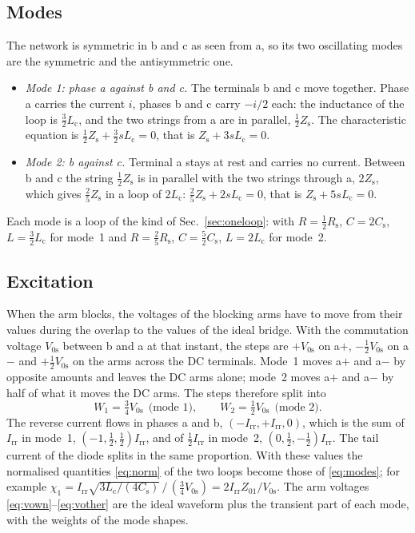 \documentclass[10pt,a4paper]{scrartcl}
\newcommand{\Irr}{I_\mathrm{rr}}
\newcommand{\Cs}{C_\mathrm{s}}
\newcommand{\Rs}{R_\mathrm{s}}
\newcommand{\Zs}{Z_\mathrm{s}}
\newcommand{\Lc}{L_\mathrm{c}}
\newcommand{\Vos}{V_\mathrm{0s}}
\begin{document}
\subsection{Modes}
The network is symmetric in b and c as seen from a, so its two oscillating modes are the symmetric and the antisymmetric one.
\begin{itemize}
\item \emph{Mode 1: phase a against b and c.} The terminals b and c move together. Phase a carries the current $i$, phases b and c carry $-i/2$ each: the inductance of the loop is $\tfrac32\Lc$, and the two strings from a are in parallel, $\tfrac12\Zs$. The characteristic equation is $\tfrac12\Zs + \tfrac32 s\Lc = 0$, that is $\Zs + 3s\Lc = 0$.
\item \emph{Mode 2: b against c.} Terminal a stays at rest and carries no current. Between b and c the string $\tfrac12\Zs$ is in parallel with the two strings through a, $2\Zs$, which gives $\tfrac25\Zs$ in a loop of $2\Lc$: $\tfrac25\Zs + 2s\Lc = 0$, that is $\Zs + 5s\Lc = 0$.
\end{itemize}
Each mode is a loop of the kind of Sec.~\ref{sec:oneloop}: with $R = \tfrac12\Rs$, $C = 2\Cs$, $L = \tfrac32\Lc$ for mode~1 and $R = \tfrac25\Rs$, $C = \tfrac52\Cs$, $L = 2\Lc$ for mode~2.

\subsection{Excitation}
When the arm blocks, the voltages of the blocking arms have to move from their values during the overlap to the values of the ideal bridge. With the commutation voltage $\Vos$ between b and a at that instant, the steps are $+\Vos$ on a$+$, $-\tfrac12\Vos$ on a$-$ and $+\tfrac12\Vos$ on the arms across the DC terminals. Mode~1 moves a$+$ and a$-$ by opposite amounts and leaves the DC arms alone; mode~2 moves a$+$ and a$-$ by half of what it moves the DC arms. The steps therefore split into
\begin{equation}
W_1 = \tfrac34\Vos \ \ \text{(mode 1)}, \qquad W_2 = \tfrac12\Vos \ \ \text{(mode 2)} .
\end{equation}
The reverse current flows in phases a and b, $(-\Irr, +\Irr, 0)$, which is the sum of $\Irr$ in mode~1, $(-1, \tfrac12, \tfrac12)\Irr$, and of $\tfrac12\Irr$ in mode~2, $(0, \tfrac12, -\tfrac12)\Irr$. The tail current of the diode splits in the same proportion. With these values the normalised quantities \eqref{eq:norm} of the two loops become those of \eqref{eq:modes}; for example $\chi_1 = \Irr\sqrt{3\Lc/(4\Cs)}\,/\,(\tfrac34\Vos) = 2\Irr Z_{01}/\Vos$. The arm voltages \eqref{eq:vown}--\eqref{eq:vother} are the ideal waveform plus the transient part of each mode, with the weights of the mode shapes.
\end{document}
